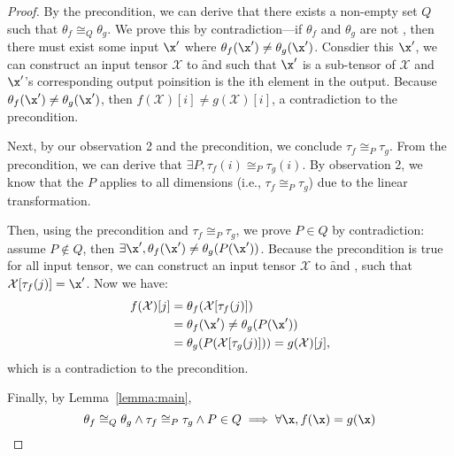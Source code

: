 \begin{proof}

By the precondition,
we can derive that there exists a non-empty set $Q$ such that $\theta_f \cong_Q \theta_g$.
We prove this by contradiction---if $\theta_f$ and $\theta_g$ are not
, then there must exist some input $\x'$ where $\theta_f(\x') \neq \theta_g(\x')$.
Consdier this $\x'$, we can construct an input tensor $\mathcal{X}$ to \f and \g
    such that $\x'$ is a sub-tensor of $\mathcal{X}$ and $\x'$'s corresponding output poinsition is the ith element in the output.
    Because $\theta_f(\x') \neq \theta_g(\x')$,
    then $f(\mathcal{X})[i] \neq g(\mathcal{X})[i]$,
    a contradiction to the precondition.


Next,
by our observation 2 and the precondition, we conclude $\tau_f \cong_P \tau_g$.
From the precondition, we can derive that $\exists P, \tau_f(i) \cong_P \tau_g(i)$.
By observation 2, we know that the $P$ applies to all
dimensions (i.e., $\tau_f \cong_P \tau_g$) due to the linear transformation.

Then, using the precondition and $\tau_f \cong_P \tau_g$, we prove $P \in Q$
by contradiction: assume $P \not\in Q$, then
$\exists \x', \theta_f(\x') \neq \theta_g(P(\x'))$.
Because the precondition is true for all input tensor,
we can construct an input tensor $\mathcal{X}$ to \f and \g,
such that $\mathcal{X}[\tau_f(j)] = \x'$.
Now we have:
    \begin{align*}
        f(\mathcal{X})[j] &= \theta_f(\mathcal{X}[\tau_f(j)]) \\
          &= \theta_f(\x') \neq \theta_g(P(\x')) \\
          & = \theta_g(P(\mathcal{X}[\tau_g(j)]))   = g(\mathcal{X})[j],
    \end{align*}
which is a contradiction to the precondition.

Finally, by Lemma~\ref{lemma:main},
    \[
\theta_f \cong_Q \theta_g \land \tau_f \cong_P \tau_g \land P \in Q \implies \forall \x, f(\x)=g(\x)
\]
\end{proof}






